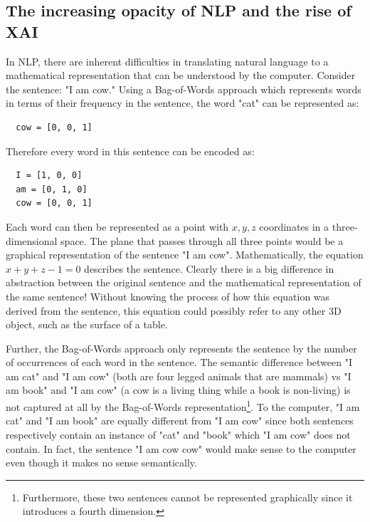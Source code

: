 \subsection{The increasing opacity of NLP and the rise of XAI}
In NLP, there are inherent difficulties in translating natural language to a mathematical representation that can be understood by the computer. Consider the sentence: "I am cow." Using a Bag-of-Words approach which represents words in terms of their frequency in the sentence, the word "cat" can be represented as:

\begin{lstlisting}
  cow = [0, 0, 1]
\end{lstlisting}

Therefore every word in this sentence can be encoded as: 

\begin{lstlisting}
  I = [1, 0, 0]
  am = [0, 1, 0]
  cow = [0, 0, 1]
\end{lstlisting}

Each word can then be represented as a point with $x, y, z$ coordinates in a three-dimensional space. The plane that passes through all three points would be a graphical representation of the sentence "I am cow". Mathematically, the equation $x + y + z - 1 = 0$ describes the sentence. Clearly there is a big difference in abstraction between the original sentence and the mathematical representation of the same sentence! Without knowing the process of how this equation was derived from the sentence, this equation could possibly refer to any other 3D object, such as the surface of a table.

Further, the Bag-of-Words approach only represents the sentence by the number of occurrences of each word in the sentence. The semantic difference between "I am cat" and "I am cow" (both are four legged animals that are mammals) vs "I am book" and "I am cow" (a cow is a living thing while a book is non-living) is not captured at all by the Bag-of-Words representation\footnote{Furthermore, these two sentences cannot be represented graphically since it introduces a fourth dimension.}. To the computer, "I am cat" and "I am book" are equally different from "I am cow" since both sentences respectively contain an instance of "cat" and "book" which "I am cow" does not contain. In fact, the sentence "I am cow cow" would make sense to the computer even though it makes no sense semantically.

